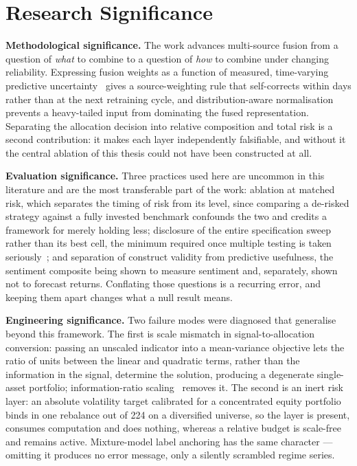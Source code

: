 \section{Research Significance}

\textbf{Methodological significance.} The work advances multi-source fusion from a question of
\emph{what} to combine to a question of \emph{how} to combine under changing reliability.
Expressing fusion weights as a function of measured, time-varying predictive
uncertainty~\cite{farimani2024,kendall2017} gives a source-weighting rule that self-corrects
within days rather than at the next retraining cycle, and distribution-aware normalisation
prevents a heavy-tailed input from dominating the fused representation. Separating the
allocation decision into relative composition and total risk is a second contribution: it makes
each layer independently falsifiable, and without it the central ablation of this thesis could
not have been constructed at all.

\textbf{Evaluation significance.} Three practices used here are uncommon in this literature and
are the most transferable part of the work: ablation at matched risk, which separates the timing
of risk from its level, since comparing a de-risked strategy against a fully invested benchmark
confounds the two and credits a framework for merely holding less; disclosure of the entire
specification sweep rather than its best cell, the minimum required once multiple testing is
taken seriously~\cite{harvey2015,bailey2014dsr,valls2026}; and separation of construct validity
from predictive usefulness, the sentiment composite being shown to measure sentiment and,
separately, shown not to forecast returns. Conflating those questions is a recurring error, and
keeping them apart changes what a null result means.

\textbf{Engineering significance.} Two failure modes were diagnosed that generalise beyond this
framework. The first is scale mismatch in signal-to-allocation conversion: passing an unscaled
indicator into a mean-variance objective lets the ratio of units between the linear and
quadratic terms, rather than the information in the signal, determine the solution, producing a
degenerate single-asset portfolio; information-ratio scaling~\cite{grinold2000} removes it. The
second is an inert risk layer: an absolute volatility target calibrated for a concentrated
equity portfolio binds in one rebalance out of 224 on a diversified universe, so the layer is
present, consumes computation and does nothing, whereas a relative budget is scale-free and
remains active. Mixture-model label anchoring has the same character --- omitting it produces no
error message, only a silently scrambled regime series.

